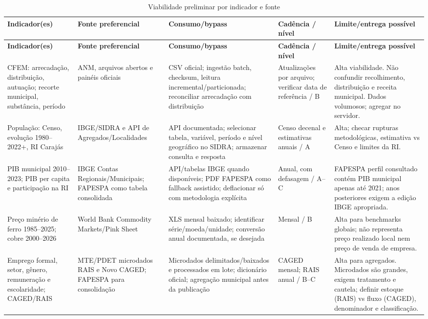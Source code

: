 \documentclass[12pt]{article}
\begin{document}
\small
\begin{longtable}{p{} p{} p{} p{} p{}}
\caption{Viabilidade preliminar por indicador e fonte}\label{tab:indicadores}\\
\toprule
\textbf{Indicador(es)} & \textbf{Fonte preferencial} & \textbf{Consumo/bypass} & \textbf{Cadência / nível} & \textbf{Limite/entrega possível}\\
\midrule
\endfirsthead
\toprule
\textbf{Indicador(es)} & \textbf{Fonte preferencial} & \textbf{Consumo/bypass} & \textbf{Cadência / nível} & \textbf{Limite/entrega possível}\\
\midrule
\endhead
\bottomrule
\endfoot
CFEM: arrecadação, distribuição, autuação; recorte municipal, substância, período & ANM, arquivos abertos e painéis oficiais \cite{anmfiles,anmdiff} & CSV oficial; ingestão batch, checksum, leitura incremental/particionada; reconciliar arrecadação com distribuição & Atualizações por arquivo; verificar data de referência / B & Alta viabilidade. Não confundir recolhimento, distribuição e receita municipal. Dados volumosos; agregar no servidor.\\
População: Censo, evolução 1980--2022+, RI Carajás & IBGE/SIDRA e API de Agregados/Localidades \cite{ibgeapi} & API documentada; selecionar tabela, variável, período e nível geográfico no SIDRA; armazenar consulta e resposta & Censo decenal e estimativas anuais / A & Alta; checar rupturas metodológicas, estimativa vs Censo e limites da RI.\\
PIB municipal 2010--2023; PIB per capita e participação na RI & IBGE Contas Regionais/Municipais; FAPESPA como tabela consolidada \cite{fapespa} & API/tabelas IBGE quando disponíveis; PDF FAPESPA como fallback assistido; deflacionar só com metodologia explícita & Anual, com defasagem / A--C & FAPESPA perfil consultado contém PIB municipal apenas até 2021; anos posteriores exigem a edição IBGE apropriada.\\
Preço minério de ferro 1985--2025; cobre 2000--2026 & World Bank Commodity Markets/Pink Sheet \cite{worldbank} & XLS mensal baixado; identificar série/moeda/unidade; conversão anual documentada, se desejada & Mensal / B & Alta para benchmarks globais; não representa preço realizado local nem preço de venda de empresa.\\
Emprego formal, setor, gênero, remuneração e escolaridade; CAGED/RAIS & MTE/PDET microdados RAIS e Novo CAGED; FAPESPA para consolidação \cite{mte,fapespa} & Microdados delimitados/baixados e processados em lote; dicionário oficial; agregação municipal antes da publicação & CAGED mensal; RAIS anual / B--C & Alta para agregados. Microdados são grandes, exigem tratamento e cautela; definir estoque (RAIS) vs fluxo (CAGED), denominador e classificação.\\

\end{longtable}
\end{document}
